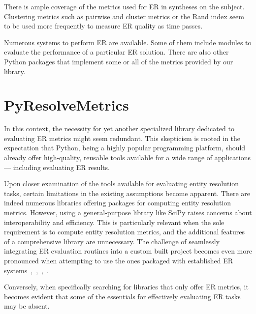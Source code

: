 \documentclass[a4paper,twoside]{article}
\begin{document}
    There is ample coverage of the metrics used for ER in syntheses on the
    subject\cite{vldb2010,hitesh2012,Tal11}.
    Clustering metrics such as pairwise and cluster metrics\cite{Men10, huang2006efficient}
    or the Rand index\cite{tal2007algebraic} seem to be used more frequently to
    measure ER quality as time passes.

    Numerous systems to perform ER are available.
    Some of them include modules to evaluate the performance of a
    particular ER solution\cite{fever2009,magellan2020,oyster2012}.
    There are also other Python packages that implement some or all of the
    metrics provided by our library\cite{ereval,virtanen2020scipy}.

    \section{PyResolveMetrics}\label{sec:library}

    In this context, the necessity for yet another specialized library dedicated
    to evaluating ER metrics might seem redundant.
    This skepticism is rooted in the expectation that Python, being a highly
    popular programming platform, should already offer high-quality, reusable
    tools available for a wide range of applications --- including evaluating
    ER results.
    
    Upon closer examination of the tools available for evaluating entity
    resolution tasks, certain limitations in the existing assumptions become
    apparent.
    There are indeed numerous libraries offering packages for computing entity
    resolution metrics.
    However, using a general-purpose library like SciPy raises concerns about
    interoperability and efficiency.
    This is particularly relevant when the sole requirement is to compute entity
    resolution metrics, and the additional features of a comprehensive library
    are unnecessary.
    The challenge of seamlessly integrating ER evaluation
    routines into a custom built project becomes even more pronounced when
    attempting to use the ones packaged with established ER
    systems~\cite{oyster2012},~\cite{jedai2017},~\cite{deepm2020},~\cite{magellan2020}.
    
    Conversely, when specifically searching for libraries that only offer ER
    metrics, it becomes evident that some of the essentials for effectively
    evaluating ER tasks may be absent\cite{ereval}.
\end{document}
